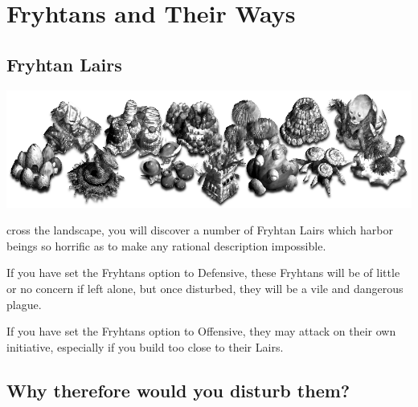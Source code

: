 
\chapter{Fryhtans and Their Ways}

\section{Fryhtan Lairs}


\begin{center}
	\includegraphics[width=0.7\linewidth]{Ilairs}
\end{center}

cross the landscape, you will discover a number of Fryhtan Lairs which harbor beings so horrific as to make any rational description impossible.

If you have set the Fryhtans option to Defensive, these Fryhtans will be of little or no concern if left alone, but once disturbed, they will be a vile and dangerous plague.

If you have set the Fryhtans option to Offensive, they may attack on their own initiative, especially if you build too close to their Lairs.

\section{Why therefore would you disturb them?}

